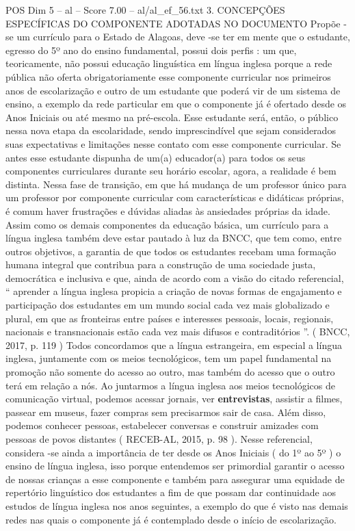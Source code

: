 \begin{textsample}{POS Dim 5 – al – Score 7.00 – al/al\_ef\_56.txt}  \label{ex:f5_pos_050}
3.
CONCEPÇÕES ESPECÍFICAS DO COMPONENTE ADOTADAS NO DOCUMENTO Propõe -se um currículo para o Estado de Alagoas, deve -se ter em mente que o estudante, egresso do 5º ano do ensino fundamental, possui dois perfis : um que, teoricamente, não possui educação linguística em língua inglesa porque a rede pública não oferta obrigatoriamente esse componente curricular nos primeiros anos de escolarização e outro de um estudante que poderá vir de um sistema de ensino, a exemplo da rede particular em que o componente já é ofertado desde os Anos Iniciais ou até mesmo na pré-escola.
Esse estudante será, então, o público nessa nova etapa da escolaridade, sendo imprescindível que sejam considerados suas expectativas e limitações nesse contato com esse componente curricular.
Se antes esse estudante dispunha de um(a) educador(a) para todos os seus componentes curriculares durante seu horário escolar, agora, a realidade é bem distinta.
Nessa fase de transição, em que há mudança de um professor único para um professor por componente curricular com características e didáticas próprias, é comum haver frustrações e dúvidas aliadas às ansiedades próprias da idade.
Assim como os demais componentes da educação básica, um currículo para a língua inglesa também deve estar pautado à luz da BNCC, que tem como, entre outros objetivos, a garantia de que todos os estudantes recebam uma formação humana integral que contribua para a construção de uma sociedade justa, democrática e inclusiva e que, ainda de acordo com a visão do citado referencial, “ aprender a língua inglesa propicia a criação de novas formas de engajamento e participação dos estudantes em um mundo social cada vez mais globalizado e plural, em que as fronteiras entre países e interesses pessoais, locais, regionais, nacionais e transnacionais estão cada vez mais difusos e contraditórios ”. ( BNCC, 2017, p. 119 ) Todos concordamos que a língua estrangeira, em especial a língua inglesa, juntamente com os meios tecnológicos, tem um papel fundamental na promoção não somente do acesso ao outro, mas também do acesso que o outro terá em relação a nós.
Ao juntarmos a língua inglesa aos meios tecnológicos de comunicação virtual, podemos acessar jornais, ver \textbf{entrevistas}, assistir a filmes, passear em museus, fazer compras sem precisarmos sair de casa.
Além disso, podemos conhecer pessoas, estabelecer conversas e construir amizades com pessoas de povos distantes ( RECEB-AL, 2015, p. 98 ).
Nesse referencial, considera -se ainda a importância de ter desde os Anos Iniciais ( do 1º ao 5º ) o ensino de língua inglesa, isso porque entendemos ser primordial garantir o acesso de nossas crianças a esse componente e também para assegurar uma equidade de repertório linguístico dos estudantes a fim de que possam dar continuidade aos estudos de língua inglesa nos anos seguintes, a exemplo do que é visto nas demais redes nas quais o componente já é contemplado desde o início de escolarização.

\end{textsample}
